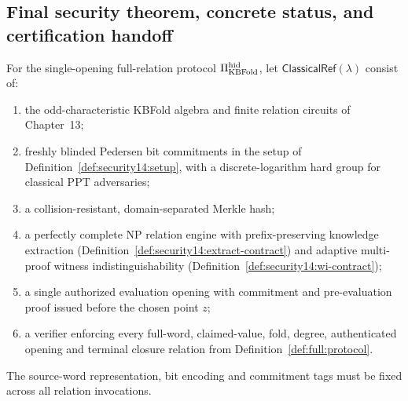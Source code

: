 \subsection{Final security theorem, concrete status, and certification handoff}\label{sec:security14:ledger}

\begin{definition}\label{def:security14:package}
For the single-opening full-relation protocol
$\Pi_{\rm KBFold}^{\rm hid}$, let
$\mathsf{ClassicalRef}(\lambda)$ consist of:
\begin{enumerate}[label=\textup{(\roman*)}]
\item the odd-characteristic
KBFold algebra and finite
relation circuits of
Chapter~13;
\item freshly blinded
Pedersen bit commitments
in the setup of
Definition~\ref{def:security14:setup},
with a discrete-logarithm
hard group for classical
PPT adversaries;
\item a collision-resistant,
domain-separated Merkle hash;
\item a perfectly complete
NP relation engine
with prefix-preserving
knowledge extraction
(Definition~\ref{def:security14:extract-contract})
and adaptive multi-proof
witness indistinguishability
(Definition~\ref{def:security14:wi-contract});
\item a single authorized
evaluation opening with
commitment and pre-evaluation
proof issued before the
chosen point $z$;
\item a verifier enforcing
every full-word, claimed-value,
fold, degree, authenticated
opening and terminal closure
relation from
Definition~\ref{def:full:protocol}.
\end{enumerate}
The source-word representation,
bit encoding and commitment
tags must be fixed across
all relation invocations.
\end{definition}

